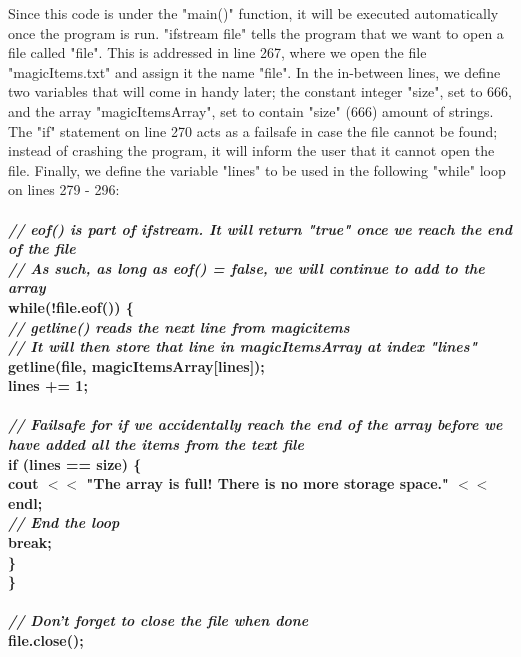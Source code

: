 \documentclass{article}
\begin{document}
Since this code is under the "main()" function, it will be executed automatically once the program is run. "ifstream file" tells the program that we want to open a file called "file". This is addressed in line 267, where we open the file "magicItems.txt" and assign it the name "file". In the in-between lines, we define two variables that will come in handy later; the constant integer "size", set to 666, and the array "magicItemsArray", set to contain "size" (666) amount of strings. The "if" statement on line 270 acts as a failsafe in case the file cannot be found; instead of crashing the program, it will inform the user that it cannot open the file. Finally, we define the variable "lines" to be used in the following "while" loop on lines 279 - 296:
\\ \textbf{
\\ \textit{ \indent // eof() is part of ifstream. It will return "true" once we reach the end of the file\\ 
    \indent // As such, as long as eof() = false, we will continue to add to the array\\ }
    \indent while(!file.eof()) \{\\
        \textit{ \indent \indent // getline() reads the next line from magicitems\\
        \indent \indent // It will then store that line in magicItemsArray at index "lines"\\ }
        \indent \indent getline(file, magicItemsArray[lines]);\\
        \indent \indent lines += 1;\\
\\
        \textit{ \indent \indent // Failsafe for if we accidentally reach the end of the array before we have added all the items from the text file\\ }
        \indent \indent if (lines == size) \{\\
            \indent \indent \indent cout $<<$ "The array is full! There is no more storage space." $<<$ endl;\\
            \textit{ \indent \indent \indent// End the loop\\ }
            \indent \indent \indent break;\\
        \indent \indent \}\\
    \indent \}\\
\\
    \textit{ \indent // Don't forget to close the file when done\\ }
    \indent file.close();\\ }
\end{document}
